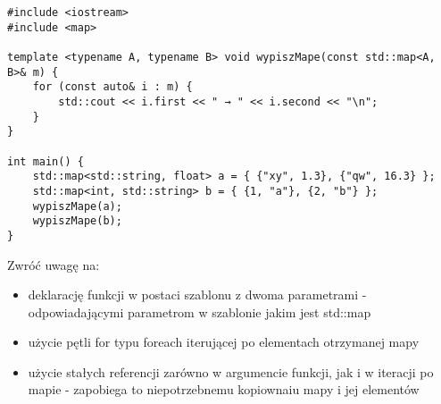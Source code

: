 \dbEntryCheckResults
\begin{verbatim}
#include <iostream>
#include <map>

template <typename A, typename B> void wypiszMape(const std::map<A, B>& m) {
	for (const auto& i : m) {
		std::cout << i.first << " → " << i.second << "\n";
	}
}

int main() {
	std::map<std::string, float> a = { {"xy", 1.3}, {"qw", 16.3} };
	std::map<int, std::string> b = { {1, "a"}, {2, "b"} };
	wypiszMape(a);
	wypiszMape(b);
}
\end{verbatim}

\noindent Zwróć uwagę na:
\begin{itemize}
\item deklarację funkcji w postaci szablonu z dwoma parametrami - odpowiadającymi parametrom w szablonie jakim jest std::map
\item użycie pętli for typu foreach iterującej po elementach otrzymanej mapy
\item użycie stałych referencji zarówno w argumencie funkcji, jak i w iteracji po mapie - zapobiega to niepotrzebnemu kopiownaiu mapy i jej elementów
\end{itemize}
\fi
